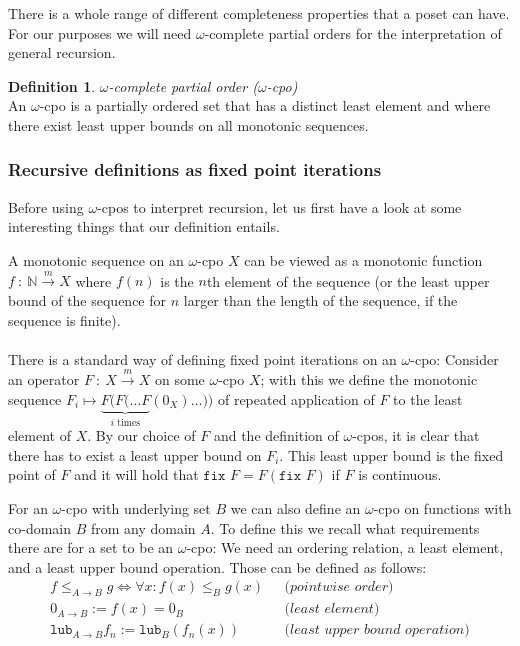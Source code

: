 \documentclass[11pt, leqno, titlepage]{article}
\theoremstyle{definition}
\newtheorem{defn}[thm]{Definition}
\begin{document}
There is a whole range of different completeness properties that a poset can have.
For our purposes we will need $\omega$-complete partial orders for the interpretation
of general recursion.  

\begin{defn}
  \textit{$\omega$-complete partial order ($\omega$-cpo)}\\
  An $\omega$-cpo is a partially ordered set that has a distinct least element and
  where there exist least upper bounds on all monotonic sequences.
\end{defn}

\subsubsection{Recursive definitions as fixed point iterations}
\label{sec:fixp-iter}

Before using $\omega$-cpos to interpret recursion, let us first have a look at some
interesting things that our definition entails.

A monotonic sequence on an $\omega$-cpo $X$ can be viewed as a monotonic function
$f~:~\mathbb{N} \xrightarrow{m} X$ where $f(n)$ is the $n$th element of the sequence (or the
least upper bound of the sequence for $n$ larger than the length of the sequence, if the sequence is finite).\\
\\
There is a standard way of defining fixed point iterations on an
$\omega$-cpo\cite{rml-paper}: Consider an operator $F~:~X \xrightarrow{m} X$ on some
$\omega$-cpo $X$; with this we define the monotonic sequence $F_i \mapsto
\underbrace{ F(F(\dots F}_{i \text{ times}} (0_X) \dots))$ of repeated application of
$F$ to the least element of $X$.  By our choice of $F$ and the definition of
$\omega$-cpos, it is clear that there has to exist a least upper bound on $F_i$. This
least upper bound is the fixed point of $F$ and it will hold that $\texttt{fix } F =
F(\texttt{fix }F)$ if $F$ is continuous.

For an $\omega$-cpo with underlying set $B$ we can also define an $\omega$-cpo on
functions with co-domain $B$ from any domain $A$.  To define this we recall what
requirements there are for a set to be an $\omega$-cpo: We need an ordering relation,
a least element, and a least upper bound operation. Those can be defined as follows:
\begin{align*}
  f\leq_{A \to B} g \Leftrightarrow \forall x: f(x) \leq_B g(x) & ~~~\textit{(pointwise order)}\\
  0_{A\to B} := f(x) = 0_B & ~~~\textit{(least element)}\\
  \texttt{lub}_{A\to B} f_n := \texttt{lub}_B(f_n(x)) & ~~~\textit{(least upper
                                                               bound operation)}
\end{align*}
\end{document}
